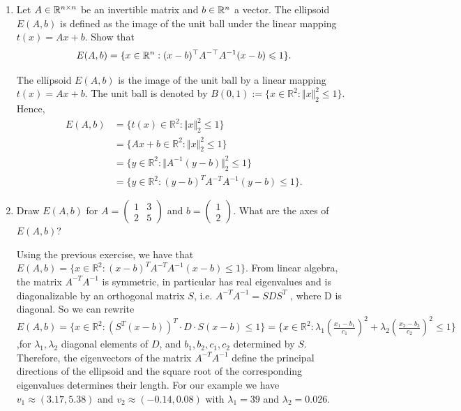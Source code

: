 \documentclass[11pt]{article}
\newcommand{\setR}{\mathbb{R}}
\renewcommand{\leq}{\leqslant}
\begin{document}
\begin{enumerate}[1)]
\begin{solution}
    \end{solution}
  
  
  
\item 
Let $A \in \mathbb{R}^{n \times n}$ be an invertible matrix and $b \in \mathbb{R}^{n}$ a vector. The ellipsoid $E(A,b)$ is defined as the image of the unit ball under the linear mapping $t(x) = Ax+b$. Show that
$$E(A,b) = \{ x \in \R^n: (x-b)^\top A^{-\top} A^{-1} (x-b) \leq 1 \}.$$


\begin{solution}
The ellipsoid $E(A,b)$ is the image of the unit ball by a linear mapping $t(x) = Ax+ b$. The unit ball
is denoted by $B(0,1) := \{x∈\setR^2 : \Vert x\Vert_2^2 ≤1\}$. Hence,
\begin{align*}
E(A,b) &= \{t(x) ∈\setR^2 : \Vert x\Vert^2_2 ≤1\} \\
& = \{Ax+ b∈\setR^2 :\Vert x\Vert_2^2 ≤1\} \\
& = \{y∈\setR^2 :\Vert A^{-1} (y−b)\Vert_2^2 ≤1\}\\
&= \{y∈\setR^2 :(y−b)^T A^{−T} A^{-1}(y−b) ≤1\}.
\end{align*}
\end{solution}
	
\item 
Draw $E(A,b)$ for $A = \begin{pmatrix} 1 & 3  \\ 2 & 5 \end{pmatrix}$ and $b  = \begin{pmatrix} 1   \\ 2 \end{pmatrix}$. What are the axes of $E(A,b)$?


\begin{solution}
Using the previous exercise, we have that $E(A,b) = \{x∈\setR^2 : (x−b)^TA^{-T}A^{-1}(x−b) ≤1\}$. From
linear algebra, the matrix $A^{-T} A^{-1}$ is symmetric, in particular has real eigenvalues and is diagonalizable by an orthogonal matrix $S$, i.e. $A^{-T} A^{-1} = SDS^T$ , where D is diagonal.
So we can rewrite $E(A,b) = \{x∈\setR^2 :(S^T(x−b))^T
·D·S(x−b) ≤1\}= \{x∈\setR^2 :λ_1\left(\frac{x_1-b_1}{c_1}\right)^2+  λ_2\left(\frac{x_2-b_2}{c_2}\right)^2  ≤1\}$,for $λ_1,λ_2$ diagonal elements of $D$, and $b_1,b_2,c_1,c_2$ determined by $S$. Therefore, the
eigenvectors of the matrix $A^{-T}A^{-1}$ define the principal directions of the ellipsoid and the square
root of the corresponding eigenvalues determines their length.
For our example we have $v_1 ≈(3.17,5.38)$ and $v_2 ≈(−0.14,0.08)$ with $λ_1 = 39$ and $λ_2 = 0.026$.
\end{solution}


\end{enumerate}
\end{document}
